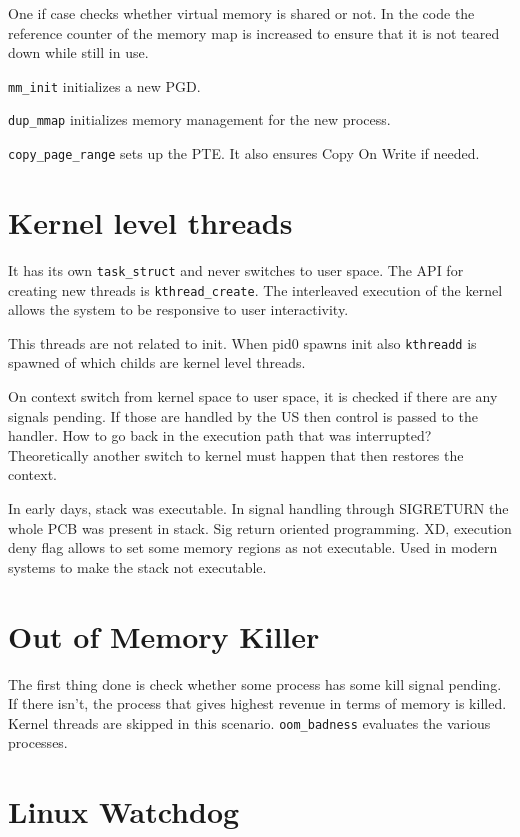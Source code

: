 \documentclass[twoside]{article}
\begin{document}
One if case checks whether virtual memory is shared or not. In the code the
reference counter of the memory map is increased to ensure that it is not teared
down while still in use.



\texttt{mm_init} initializes a new PGD.

\texttt{dup_mmap} initializes memory management for the new process.

\texttt{copy_page_range} sets up the PTE. It also ensures Copy On Write if
needed.


\section{Kernel level threads}
\label{sec:Kernel level threads}

It has its own \texttt{task_struct} and never switches to user space. The API
for creating new threads is \texttt{kthread_create}. The interleaved execution
of the kernel allows the system to be responsive to user interactivity.

This threads are not related to init. When pid0 spawns init also
\texttt{kthreadd} is spawned of which childs are kernel level threads.


On context switch from kernel space to user space, it is checked if there are
any signals pending. If those are handled by the US then control is passed to
the handler. How to go back in the execution path that was interrupted?
Theoretically another switch to kernel must happen that then restores the
context.

In early days, stack was executable. In signal handling through SIGRETURN the
whole PCB was present in stack. Sig return oriented programming. XD, execution
deny flag allows to set some memory regions as not executable. Used in modern
systems to make the stack not executable.

\section{Out of Memory Killer}
\label{sec:Out of Memory Killer}

The first thing done is check whether some process has some kill signal pending.
If there isn't, the process that gives highest revenue in terms of memory is
killed. Kernel threads are skipped in this scenario. \texttt{oom_badness}
evaluates the various processes.

\section{Linux Watchdog}
\label{sec:Linux Watchdog}
\end{document}
